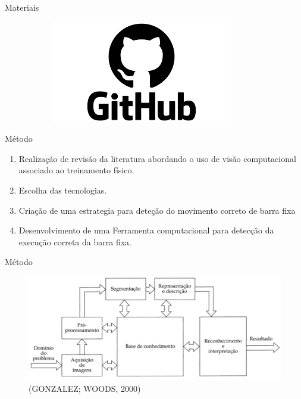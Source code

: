 \begin{frame}{Materiais}
\begin{figure}[!ht]
\begin{subfigure}[H]{0.3\textwidth}
            \label{fig_op_af}
          \end{subfigure}
          \begin{subfigure}[H]{0.3\textwidth}
            \includegraphics[width=\textwidth]{img/logo/Git.png}
          \end{subfigure}
          
      
    \end{figure}
\end{frame}



\begin{frame}{Método}
    \begin{enumerate}
        \item Realização de revisão da literatura abordando o uso de visão computacional associado ao treinamento físico.
        \vspace*{0.80cm}
        \item Escolha das tecnologias.
        \vspace*{0.80cm}
        \item Criação de uma estrategia para deteção do movimento correto de barra fixa
        \vspace*{0.80cm}
        \item Desenvolvimento de uma Ferramenta computacional para detecção da execução correta da barra fixa.
    \end{enumerate}
\end{frame}


\begin{frame}{Método}
    \begin{figure}[!ht]
        \centering
        \includegraphics[scale=0.33]{img/metodos/processamentoImagem.png}
        \caption*{(GONZALEZ; WOODS, 2000)}
    \end{figure}
\end{frame}